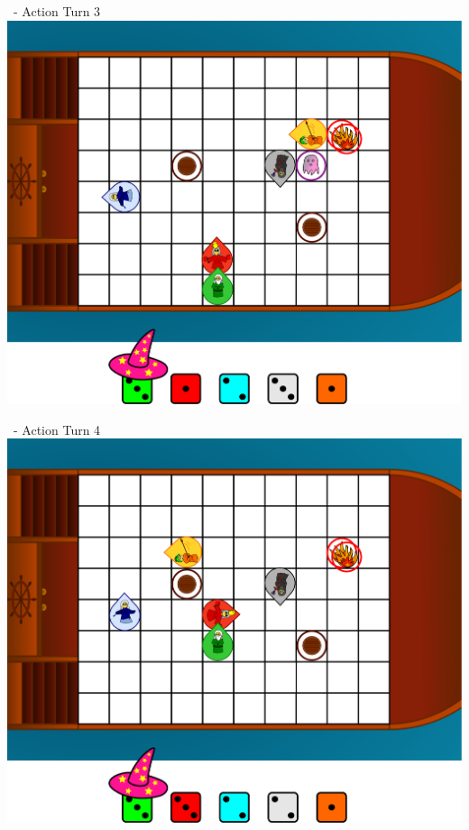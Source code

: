 \documentclass[presentation]{beamer}
\begin{document}
\begin{frame}{\insertsection\ - Action Turn 3}
	\center
	\includegraphics[width=\textheight]{ingame_sketch_3.pdf}
\end{frame}

\begin{frame}{\insertsection\ - Action Turn 4}
	\center
	\includegraphics[width=\textheight]{ingame_sketch_4.pdf}
\end{frame}
\end{document}
